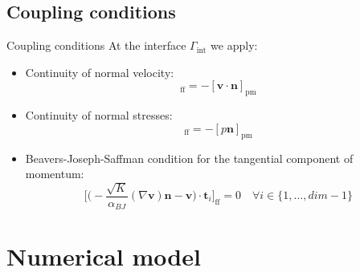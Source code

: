 \documentclass{beamer}
\begin{document}
\subsection*{Coupling conditions}
\begin{frame}{Coupling conditions}
At the interface $\Gamma_\text{int}$ we apply:
\begin{itemize}
	\item Continuity of normal velocity:
	\begin{equation*}
	[\mathbf{v} \cdot \mathbf{n}]_\text{ff} = - [\mathbf{v} 
	\cdot \mathbf{n}]_\text{pm}
	\end{equation*}
	\item Continuity of normal stresses:
	\begin{equation*}
	[(\varrho \mathbf{v} \mathbf{v}^\mathrm{T} - (\mu + \mu_t) \nabla 
	\mathbf{v} + p\mathbbm{1}) 
	\mathbf{n}]_\text{ff} = 
	- [p\mathbf{n}]_\text{pm}
	\end{equation*}
	\item Beavers-Joseph-Saffman condition for the tangential component of 
	momentum:
	\begin{equation*}
	\bigg[ \bigg( -\frac{\sqrt{K}}{\alpha_{BJ}} (\nabla \mathbf{v}) 
	\mathbf{n} - \mathbf{v} \bigg) \cdot \mathbf{t}_i \bigg]_\text{ff} = 0 
	\quad \forall i \in \{1, \dots, dim - 1\}
	\end{equation*}
\end{itemize}
\end{frame}
\section{Numerical model}
\end{document}
